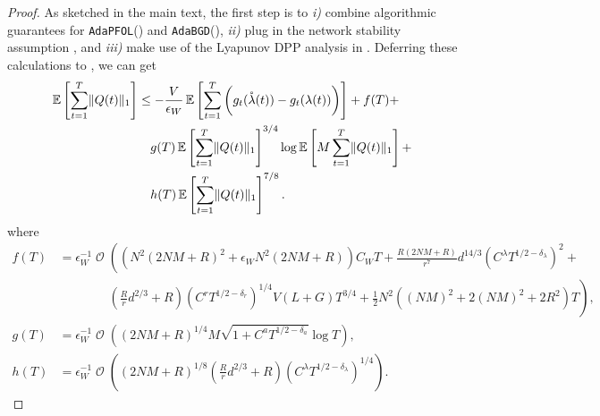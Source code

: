 \documentclass[11pt,fullpage,letterpaper]{article} %
\renewcommand{\bm}[1]{#1}%
\renewcommand{\O}{\operatorname{\mathcal O}}
\newcommand{\E}{\operatornamewithlimits{\mathbb{E}}}
\newcommand{\OLOAlg}{\texttt{AdaPFOL}\xspace}
\newcommand{\BCOAlg}{\texttt{AdaBGD}\xspace}
\begin{document}
\begin{proof}
As sketched in the main text, the first step is to \textit{i)} combine algorithmic guarantees for \OLOAlg () and \BCOAlg (), \textit{ii)} plug in the network stability assumption , and \textit{iii)} make use of the Lyapunov DPP analysis in . Deferring these calculations to , we can get
\begin{align}
\E\left [\sum_{t=1}^T \lVert \bm Q(t)\rVert_1\right ]&\le -\frac{V}{\epsilon_W} \E\left [\sum_{t=1}^T \bigg (g_t(\mathring{\bm \lambda}(t)) - g_t(\bm \lambda(t))\bigg )\right ] + f(T) + \nonumber \\
&\quad g(T) \E\left [\sum_{t=1}^T \lVert \bm Q(t)\rVert_1\right ]^{3/4} \log \E\left [M \sum_{t=1}^T \lVert \bm Q(t)\rVert_1\right ] + \nonumber \\
&\quad h(T) \E\left [\sum_{t=1}^T \lVert \bm Q(t)\rVert_1\right ]^{7/8}.\label{eq:multi-hop utility self-bounding}
\end{align}
where
\begin{align*}
f(T)&= \epsilon_W^{-1} \O\left ((N^2 (2NM+R)^2 + \epsilon_W N^2 (2NM+R)) C_W T + \frac{R(2NM+R)}{r^7} d^{14/3} (C^\lambda T^{1/2 - \delta_\lambda})^2\right .+\\
&\qquad \qquad \left .\left (\frac{R}{r} d^{2/3}+R\right ) (C^r T^{1/2 - \delta_r})^{1/4} V(L+G) T^{3/4}+\frac 12 N^2 ((NM)^2+2(NM)^2+2R^2) T\right ),\\
g(T)&=\epsilon_W^{-1} \O\left ((2NM+R)^{1/4} M \sqrt{1+C^a T^{1/2 - \delta_a}} \log T \right ), \\
h(T)&=\epsilon_W^{-1} \O\left ((2NM+R)^{1/8} \left (\frac Rr d^{2/3} + R\right ) (C^\lambda T^{1/2 - \delta_\lambda})^{1/4}\right ).
\end{align*}


\end{proof}
\end{document}
